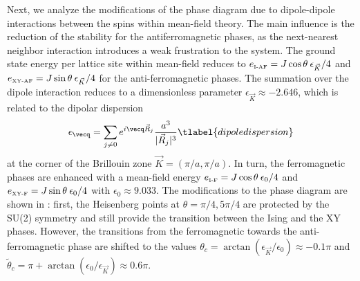 Next, we analyze the modifications of the phase diagram due to dipole-dipole
interactions between the spins within mean-field theory. The
main influence is the reduction of the stability for the antiferromagnetic
phases, as the next-nearest neighbor interaction introduces a weak frustration
to the system. The ground state energy per lattice site within mean-field
reduces to $ e_{\mbox{\tiny I-AF}} = J \cos \theta \: \epsilon_{\vec K}/4$ and $e_{\mbox{\tiny XY-AF}} = J \sin \theta \: \epsilon_{\vec K}/4$
for the anti-ferromagnetic phases. The summation over the dipole interaction
reduces to a dimensionless parameter $\epsilon_{\vec K} \approx -2.646$, which is related to
the dipolar dispersion
%
\begin{align}
    \epsilon_{\vecq} = \sum_{j \neq 0} e^{i \vecq \vec{R}_{j} }\frac{a^3}{|{\vec R}_{j}|^3}
  \tlabel{dipoledispersion}
\end{align}
%
at the corner of the Brillouin zone ${\vec K} = (\pi/a, \pi /a)$.
In turn, the ferromagnetic phases are enhanced with a mean-field energy
$e_{\mbox{\tiny I-F}} = J \cos \theta \: \epsilon_0/4 $ and $ e_{\mbox{\tiny XY-F}} = J \sin \theta \: \epsilon_0/4$
with $\epsilon_{0} \approx 9.033$. The modifications to the
phase diagram are shown in : first, the Heisenberg points at
$\theta = \pi/4, 5 \pi/4$ are protected by the SU(2) symmetry and still
provide the transition between the Ising and the XY phases. However, the
transitions from the ferromagnetic towards the anti-ferromagnetic phase are
shifted to the values $\theta_{c}= \arctan(\epsilon_{\vec K}/\epsilon_{0})
\approx -0.1 \pi$ and $\tilde{\theta}_c = \pi+ \arctan(\epsilon_{0}/\epsilon_{\vec K})\approx 0.6 \pi$.


